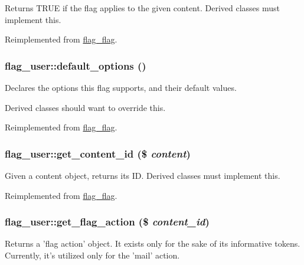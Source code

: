 Returns TRUE if the flag applies to the given content. Derived classes must implement this.

Reimplemented from \hyperlink{classflag__flag_55c4da8291aed979309f25ce09953092}{flag\_\-flag}.\hypertarget{classflag__user_5df658a9df123b09608c3438a06fe86e}{
\subsubsection[{default\_\-options}]{\setlength{\rightskip}{0pt plus 5cm}flag\_\-user::default\_\-options ()}}
\label{classflag__user_5df658a9df123b09608c3438a06fe86e}


Declares the options this flag supports, and their default values.

Derived classes should want to override this. 

Reimplemented from \hyperlink{classflag__flag_240678d55d61a16ef848ecc0cc3c609f}{flag\_\-flag}.\hypertarget{classflag__user_3cb6ed47377662232c4f41bfe2f41f09}{
\subsubsection[{get\_\-content\_\-id}]{\setlength{\rightskip}{0pt plus 5cm}flag\_\-user::get\_\-content\_\-id (\$ {\em content})}}
\label{classflag__user_3cb6ed47377662232c4f41bfe2f41f09}


Given a content object, returns its ID. Derived classes must implement this.

Reimplemented from \hyperlink{classflag__flag_4da5889b258c2bc28b248678573b881a}{flag\_\-flag}.\hypertarget{classflag__user_6b753497cc4bd54f8328b8d0e7185142}{
\subsubsection[{get\_\-flag\_\-action}]{\setlength{\rightskip}{0pt plus 5cm}flag\_\-user::get\_\-flag\_\-action (\$ {\em content\_\-id})}}
\label{classflag__user_6b753497cc4bd54f8328b8d0e7185142}


Returns a 'flag action' object. It exists only for the sake of its informative tokens. Currently, it's utilized only for the 'mail' action.

